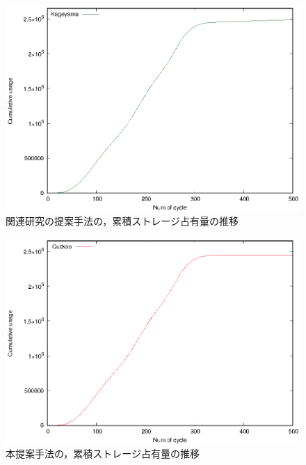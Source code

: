 \documentclass[11pt]{jreport}
\begin{document}
\begin{figure}[H]
	\begin{center}
		\includegraphics[width=15.0cm]{./figure/relate_occupancy.eps}
	\end{center}
	\caption{関連研究の提案手法の，累積ストレージ占有量の推移}
	\label{fig:relate_o}
\end{figure}

\begin{figure}[H]
	\begin{center}
		\includegraphics[width=15.0cm]{./figure/cuckoo_occupancy.eps}
	\end{center}
	\caption{本提案手法の，累積ストレージ占有量の推移}
	\label{fig:cuckoo_o}
\end{figure}
\end{document}
